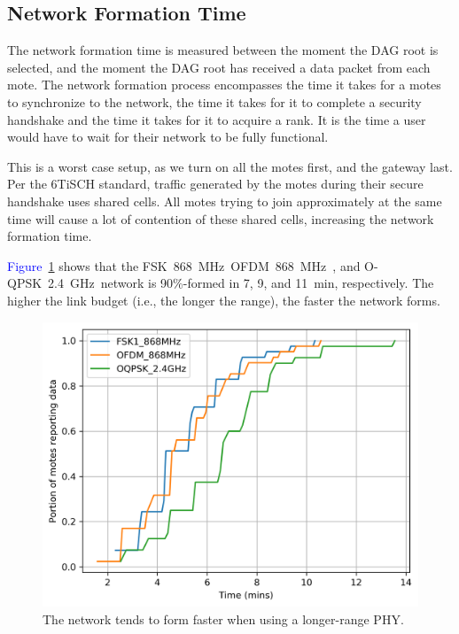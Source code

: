 \documentclass[sensors,article,submit,moreauthors,pdftex]{Definitions/mdpi}
\newcommand{\fsk}           {FSK~868~MHz}
\newcommand{\oqpsk}         {O-QPSK~2.4~GHz}
\newcommand{\ofdm}          {OFDM~868~MHz}
\newcommand{\figwidth}      {0.78}
\newcommand{\update}[1]     {\textcolor{blue}{#1}}
\begin{document}
\subsection{Network Formation Time}
\label{sec:res_formation}


The network formation time is measured between the moment the DAG root is selected, and the moment the DAG root has received a data packet from each mote.
The network formation process encompasses
    the time it takes for a motes to synchronize to the network,
    the time it takes for it to complete a security handshake and
    the time it takes for it to acquire a rank.
It is the time a user would have to wait for their network to be fully functional.


This is a worst case setup, as we turn on all the motes first, and the gateway last.
Per the 6TiSCH standard, traffic generated by the motes during their secure handshake uses shared cells.
All motes trying to join approximately at the same time will cause a lot of contention of these shared cells, increasing the network formation time.


\update{Figure}~\ref{fig:time_firstpacket_cdf} shows that the \fsk\, \ofdm\  , and \oqpsk\ network is 90\%-formed in 7, 9, and 11~min, respectively.
The higher the link budget (i.e., the longer the range), the faster the network forms.

\begin{figure}[ht]
	\centering
	\includegraphics[width=\figwidth\columnwidth]{time_firstpacket_cdf}
	\caption{The network tends to form faster when using a longer-range PHY.}
    \label{fig:time_firstpacket_cdf}
\end{figure}
\end{document}
